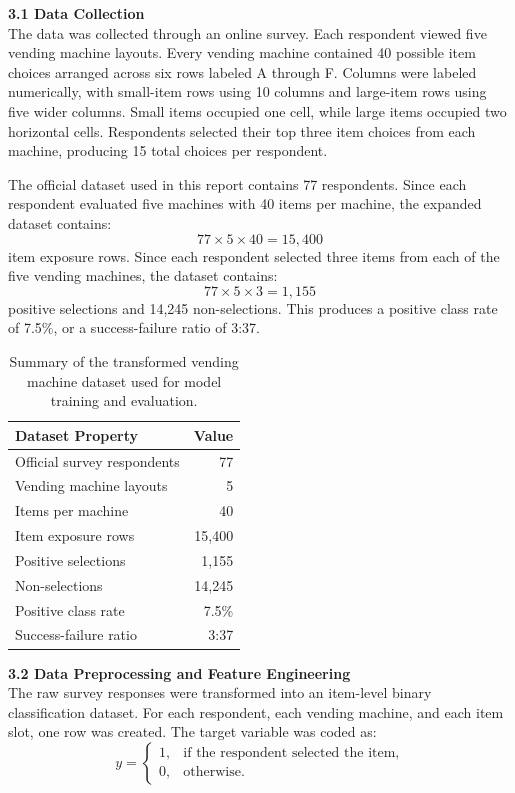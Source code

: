 \documentclass{article}
\begin{document}
\textbf{3.1 Data Collection} \\

The data was collected through an online survey. Each respondent viewed five vending machine layouts. Every vending machine contained 40 possible item choices arranged across six rows labeled A through F. Columns were labeled numerically, with small-item rows using 10 columns and large-item rows using five wider columns. Small items occupied one cell, while large items occupied two horizontal cells. Respondents selected their top three item choices from each machine, producing 15 total choices per respondent.

The official dataset used in this report contains 77 respondents. Since each respondent evaluated five machines with 40 items per machine, the expanded dataset contains:
\[
77 \times 5 \times 40 = 15{,}400
\]
item exposure rows. Since each respondent selected three items from each of the five vending machines, the dataset contains:
\[
77 \times 5 \times 3 = 1{,}155
\]
positive selections and 14,245 non-selections. This produces a positive class rate of 7.5\%, or a success-failure ratio of 3:37.

\begin{table}[H]
    \centering
    \begin{tabular}{l r}
        \toprule
        Dataset Property & Value \\
        \midrule
        Official survey respondents & 77 \\
        Vending machine layouts & 5 \\
        Items per machine & 40 \\
        Item exposure rows & 15,400 \\
        Positive selections & 1,155 \\
        Non-selections & 14,245 \\
        Positive class rate & 7.5\% \\
        Success-failure ratio & 3:37 \\
        \bottomrule
    \end{tabular}
    \caption{Summary of the transformed vending machine dataset used for model training and evaluation.}
    \label{tab:dataset_summary}
\end{table}

\textbf{3.2 Data Preprocessing and Feature Engineering} \\

The raw survey responses were transformed into an item-level binary classification dataset. For each respondent, each vending machine, and each item slot, one row was created. The target variable was coded as:
\[
y =
\begin{cases}
1, & \text{if the respondent selected the item,}\\
0, & \text{otherwise.}
\end{cases}
\]
\end{document}
